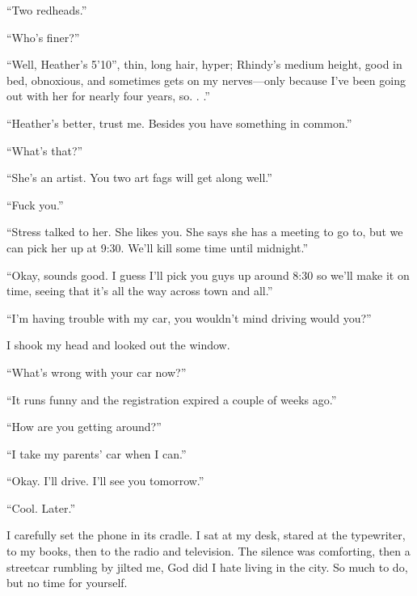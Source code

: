 ``Two redheads.''

``Who's finer?''

``Well, Heather's 5'10'', thin, long hair, hyper; Rhindy's medium
height, good in bed, obnoxious, and sometimes gets on my nerves---only
because I've been going out with her for nearly four years, so. . .''

``Heather's better, trust me. Besides you have something in common.''

``What's that?''

``She's an artist. You two art fags will get along well.''

``Fuck you.''

``Stress talked to her. She likes you. She says she has a meeting to go
to, but we can pick her up at 9:30. We'll kill some time until
midnight.''

``Okay, sounds good. I guess I'll pick you guys up around 8:30 so we'll
make it on time, seeing that it's all the way across town and all.''

``I'm having trouble with my car, you wouldn't mind driving would you?''

I shook my head and looked out the window.

``What's wrong with your car now?''

``It runs funny and the registration expired a couple of weeks ago.''

``How are you getting around?''

``I take my parents' car when I can.''

``Okay. I'll drive. I'll see you tomorrow.''

``Cool. Later.''

I carefully set the phone in its cradle. I sat at my desk, stared at the
typewriter, to my books, then to the radio and television. The silence
was comforting, then a streetcar rumbling by jilted me, God did I hate
living in the city. So much to do, but no time for yourself.

